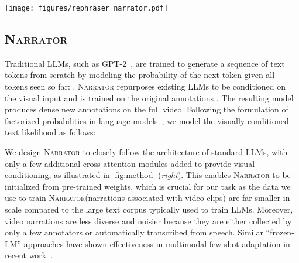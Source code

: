 \documentclass[10pt,twocolumn,letterpaper]{article}
\newcommand{\myparagraph}[1]{\vspace{0pt}\noindent{\bf #1}}
\newcommand{\narrator}{\textsc{Narrator}\xspace}
\newcommand{\rephraser}{\textsc{Rephraser}\xspace}
\begin{document}
\begin{figure*}[t]
	\vspace{-10pt}
	\centering
	\texttt{[image: figures/rephraser\_narrator.pdf]}
	\caption{{\bf Language supervision from \rephraser and \narrator}.
	\rephraser {\em (left)} takes the narration as input, passes it through a text encoder and uses a text decoder to autoregressively generate the rephrased output.
	\narrator {\em (right)} takes video frames as input and obtains the visual embeddings through a video encoder followed by attentional pooling. Equipped with a few additional cross-attention modules, the text decoder autoregressively generates new narrations for those new frames.}
	\label{fig:method}
\end{figure*}

\subsection{\bf \narrator}
\label{sec:method:pseudo_caption}




Traditional LLMs, such as GPT-2~\cite{radford2019gpt2}, are trained to generate a sequence of text tokens  from scratch by modeling the probability of the next token given all tokens seen so far: .
\narrator repurposes existing LLMs to be conditioned on the visual input and is trained on the original annotations . The resulting model produces dense new annotations  on the full video.
Following the formulation of factorized probabilities in language models~\cite{bengio2020neural}, we model the visually conditioned text likelihood as follows:
{\small

}

\myparagraph{Architecture.}
We design \narrator to closely follow the architecture of standard LLMs, with only a few additional cross-attention modules added to provide visual conditioning, as illustrated in \cref{fig:method} ({\em right}).
This enables \narrator to be initialized from pre-trained weights, which is crucial for our task as the data we use to train \narrator (narrations associated with video clips) are far smaller in scale
compared to the large text corpus typically used to train LLMs. Moreover, video narrations are less diverse and noisier because they are either collected by only a few annotators or automatically transcribed from speech.
Similar ``frozen-LM'' approaches have shown effectiveness in
multimodal few-shot adaptation in recent work~\cite{tsimpoukelli2021multimodal,alayrac2022flamingo}.
\end{document}
